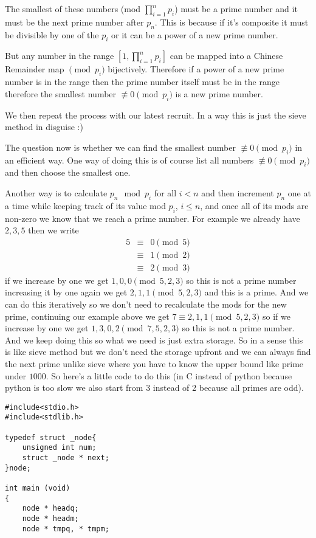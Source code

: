 \documentclass[aps,preprint,preprintnumbers,nofootinbib,showpacs,prd]{revtex4-1}
\newcommand{\nbea}{\begin{eqnarray*}}
\newcommand{\neea}{\end{eqnarray*}}
\begin{document}
\begin{enumerate}
The smallest of these numbers (mod $\prod_{i=1}^n p_i$) must be a prime number and it must be the next prime number after $p_n$. This is because if it's composite it must be divisible by one of the $p_i$ or it can be a power of a new prime number. 

But any number in the range $[1,\prod_{i = 1}^n p_i]$ can be mapped into a Chinese Remainder map $\pmod{p_i}$ bijectively. Therefore if a power of a new prime number is in the range then the prime number itself must be in the range therefore the smallest number $\not\equiv 0 \pmod{p_i}$ is a new prime number.

We then repeat the process with our latest recruit. In a way this is just the sieve method in disguise :) 

The question now is whether we can find the smallest number $\not\equiv 0 \pmod{p_i}$ in an efficient way. One way of doing this is of course list all numbers $\not \equiv 0 \pmod{p_i}$ and then choose the smallest one.

Another way is to calculate $p_n \mod p_i$ for all $i < n$ and then increment $p_n$ one at a time while keeping track of its value mod $p_i$, $i \le n$, and once all of its mods are non-zero we know that we reach a prime number. For example we already have $2,3,5$ then we write 
%
\nbea
5 & \equiv & 0 \pmod{5} \\
& \equiv & 1 \pmod{2} \\
& \equiv & 2 \pmod{3} 
\neea
%
if we increase by one we get $1,0,0 \pmod{5,2,3}$ so this is not a prime number increasing it by one again we get $2,1,1 \pmod {5,2,3}$ and this is a prime. And we can do this iteratively so we don't need to recalculate the mods for the new prime, continuing our example above we get $7 \equiv 2,1,1 \pmod{5,2,3}$ so if we increase by one we get $1,3,0,2 \pmod{7,5,2,3}$ so this is not a prime number. And we keep doing this so what we need is just extra storage. So in a sense this is like sieve method but we don't need the storage upfront and we can always find the next prime unlike sieve where you have to know the upper bound like prime under $1000$. So here's a little code to do this (in C instead of python because python is too slow we also start from 3 instead of 2 because all primes are odd).  
%
\begin{Verbatim}[baselinestretch=0.75]
#include<stdio.h>
#include<stdlib.h>

typedef struct _node{
    unsigned int num;
    struct _node * next;
}node;

int main (void)
{
    node * headq;
    node * headm;
    node * tmpq, * tmpm;
    

\end{Verbatim}
\end{enumerate}
\end{document}
